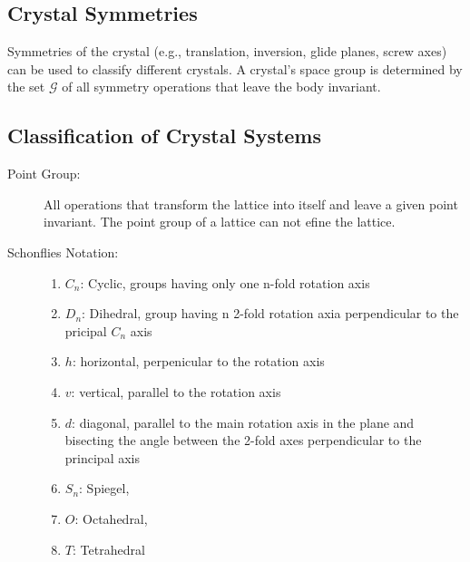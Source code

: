 \documentclass[10pt, a4paper]{article}
\begin{document}
\subsection*{Crystal Symmetries}
Symmetries of the crystal (e.g., translation, inversion, glide planes, screw axes) can be used to classify different crystals. A crystal's space group is determined by the set $\mathcal{G}$ of all symmetry operations that leave the body invariant.

\subsection*{Classification of Crystal Systems}

\begin{description}
    \item[Point Group:] All operations that transform the lattice into itself and leave a given point invariant. The point group of a lattice can not efine the lattice. 
    \item[Schonflies Notation:] 
    \begin{enumerate}
        \item $C_n$: Cyclic, groups having only one n-fold rotation axis
        \item $D_n$: Dihedral, group having n 2-fold rotation axia perpendicular to the pricipal $C_n$ axis
        \item $h$: horizontal, perpenicular to the rotation axis
        \item $v$: vertical, parallel to the rotation axis
        \item $d$: diagonal, parallel to the main rotation axis in the plane and bisecting the angle between the 2-fold axes perpendicular to the principal axis
        \item $S_n$: Spiegel, 
        \item $O$: Octahedral,
        \item $T$: Tetrahedral
    \end{enumerate}
\end{description}
\end{document}

